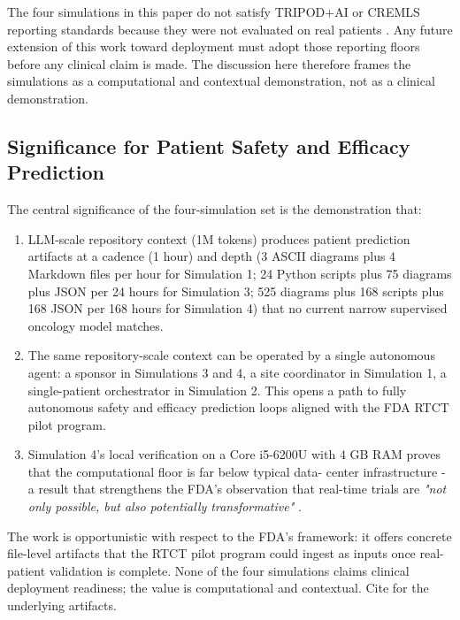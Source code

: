 The four simulations in this paper do not satisfy TRIPOD+AI or CREMLS
reporting standards because they were not evaluated on real patients
\cite{Collins2024TRIPODAI, ElEmam2024CREMLS}. Any future extension of
this work toward deployment must adopt those reporting floors before
any clinical claim is made. The discussion here therefore frames the
simulations as a computational and contextual demonstration, not as a
clinical demonstration.

\subsection{Significance for Patient Safety and Efficacy Prediction}
\label{sec:disc-significance}

The central significance of the four-simulation set is the
demonstration that:

\begin{enumerate}[leftmargin=*]
\item LLM-scale repository context (1M tokens) produces patient
prediction artifacts at a cadence (1 hour) and depth (3 ASCII
diagrams plus 4 Markdown files per hour for Simulation 1; 24 Python
scripts plus 75 diagrams plus JSON per 24 hours for Simulation 3;
525 diagrams plus 168 scripts plus 168 JSON per 168 hours for
Simulation 4) that no current narrow supervised oncology model
matches.



\item The same repository-scale context can be operated by a single
autonomous agent: a sponsor in Simulations 3 and 4, a site
coordinator in Simulation 1, a single-patient orchestrator in
Simulation 2. This opens a path to fully autonomous safety and
efficacy prediction loops aligned with the FDA RTCT pilot program.

\item Simulation 4's local verification on a Core i5-6200U with 4 GB
RAM proves that the computational floor is far below typical data-
center infrastructure - a result that strengthens the FDA's
observation that real-time trials are \emph{"not only possible, but
also potentially transformative"} \cite{fda2026realtime}.
\end{enumerate}

The work is opportunistic with respect to the FDA's framework: it
offers concrete file-level artifacts that the RTCT pilot program could
ingest as inputs once real-patient validation is complete. None of
the four simulations claims clinical deployment readiness; the value
is computational and contextual. Cite \cite{fda2026realtime,
kawchak_2026_19176370, kawchak_2026_19244918, kawchak_2026_18810541,
kawchak_2026_19119939, kawchak_2026_19396256} for the underlying
artifacts.

